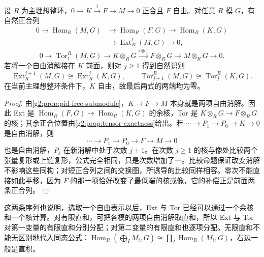 \begin{proposition}\label{g2:prop:dimension-shifting}
	设 \(R\) 为主理想整环，\(0\to K\xrightarrow{i}F\to M\to0\) 正合且 \(F\) 自由。对任意 \(R\) 模 \(G\)，有自然正合列
	\[
		\begin{aligned}
			0\longrightarrow\operatorname{Hom}_R(M,G)&\longrightarrow\operatorname{Hom}_R(F,G)\longrightarrow\operatorname{Hom}_R(K,G)\\
			&\longrightarrow\operatorname{Ext}_R^1(M,G)\longrightarrow0,
		\end{aligned}
	\]
	\[
		0\longrightarrow\operatorname{Tor}^R_1(M,G)\longrightarrow K\otimes_R G\xrightarrow{i\otimes1}F\otimes_R G\longrightarrow M\otimes_R G\longrightarrow0.
	\]
	若将一个自由消解接在 \(K\) 前面，则对 \(j\ge1\) 得到自然识别
	\[
		\operatorname{Ext}_R^{j+1}(M,G)\cong\operatorname{Ext}_R^j(K,G),\qquad
		\operatorname{Tor}^R_{j+1}(M,G)\cong\operatorname{Tor}^R_j(K,G).
	\]
	在当前主理想整环条件下，\(K\) 自由，故最后两式的两端均为零。
\end{proposition}
\begin{proof}
	由\cref{g2:prop:pid-free-submodule}，\(K\to F\to M\) 本身就是两项自由消解。因此 Ext 是 \(\operatorname{Hom}_R(F,G)\to\operatorname{Hom}_R(K,G)\) 的余核，Tor 是 \(K\otimes_R G\to F\otimes_R G\) 的核；其余正合位置由\cref{g2:prop:tensor-exactness}给出。若 \(\cdots\to P_1\to P_0\to K\to0\) 是自由消解，则
	\[
		\cdots\longrightarrow P_1\longrightarrow P_0\longrightarrow F\longrightarrow M\longrightarrow0
	\]
	也是自由消解，\(P_j\) 在新消解中处于次数 \(j+1\)。在次数 \(j\ge1\) 的核与像处比较两个张量复形或上链复形，公式完全相同，只是次数增加了一。比较命题保证改变消解不影响这些同构；对短正合列之间的交换图，所诱导的比较同样相容。零次不能直接如此平移，因为 \(F\) 的那一项恰好改变了最低端的核或像，它的补偿正是前面两条正合列。
\end{proof}

这两条序列也说明，选取一个自由表示以后，Ext 与 Tor 已经可以通过一个余核和一个核计算。对有限直和，可把各模的两项自由消解取直和，所以 Ext 与 Tor 对第一变量的有限直和分别分配；对第二变量的有限直和也逐项分配。无限直和不能无区别地代入同态公式：\(\operatorname{Hom}_R(\bigoplus_I M_i,G)\cong\prod_I\operatorname{Hom}_R(M_i,G)\)，右边一般是直积。

